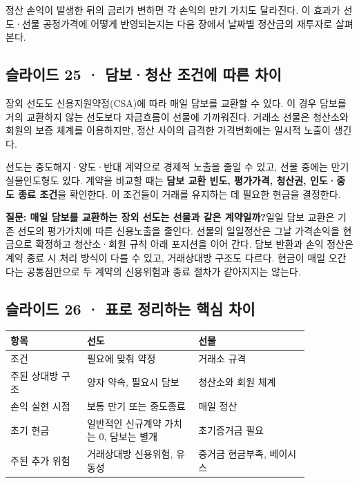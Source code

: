 \documentclass[11pt,a4paper]{article}
\begin{document}
정산 손익이 발생한 뒤의 금리가 변하면 각 손익의 만기 가치도 달라진다. 이 효과가 선도·선물 공정가격에 어떻게 반영되는지는 다음 장에서 날짜별 정산금의 재투자로 살펴본다.\par

\subsection{슬라이드 25 · 담보·청산 조건에 따른 차이}
장외 선도도 신용지원약정(CSA)에 따라 매일 담보를 교환할 수 있다. 이 경우 담보를 거의 교환하지 않는 선도보다 자금흐름이 선물에 가까워진다. 거래소 선물은 청산소와 회원의 보증 체계를 이용하지만, 정산 사이의 급격한 가격변화에는 일시적 노출이 생긴다.\par

선도는 중도해지·양도·반대 계약으로 경제적 노출을 줄일 수 있고, 선물 중에는 만기 실물인도형도 있다. 계약을 비교할 때는 \textbf{담보 교환 빈도, 평가가격, 청산권, 인도·중도 종료 조건}을 확인한다. 이 조건들이 거래를 유지하는 데 필요한 현금을 결정한다.\par

\par\medskip\noindent\textbf{질문: 매일 담보를 교환하는 장외 선도는 선물과 같은 계약일까?}\quad 일일 담보 교환은 기존 선도의 평가가치에 따른 신용노출을 줄인다. 선물의 일일정산은 그날 가격손익을 현금으로 확정하고 청산소·회원 규칙 아래 포지션을 이어 간다. 담보 반환과 손익 정산은 계약 종료 시 처리 방식이 다를 수 있고, 거래상대방 구조도 다르다. 현금이 매일 오간다는 공통점만으로 두 계약의 신용위험과 종료 절차가 같아지지는 않는다.\par

\subsection{슬라이드 26 · 표로 정리하는 핵심 차이}
\begin{center}\small\begin{tabular}{p{0.22\linewidth}p{0.32\linewidth}p{0.32\linewidth}}\hline
항목 & 선도 & 선물 \\ \hline
조건 & 필요에 맞춰 약정 & 거래소 규격 \\
주된 상대방 구조 & 양자 약속, 필요시 담보 & 청산소와 회원 체계 \\
손익 실현 시점 & 보통 만기 또는 중도종료 & 매일 정산 \\
초기 현금 & 일반적인 신규계약 가치는 0, 담보는 별개 & 초기증거금 필요 \\
주된 추가 위험 & 거래상대방 신용위험, 유동성 & 증거금 현금부족, 베이시스 \\
\hline\end{tabular}\end{center}\normalsize
\end{document}
